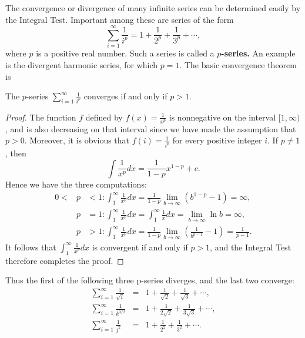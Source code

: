 The convergence or divergence of many infinite series can be determined easily by the Integral Test. Important among these are series of the form
$$
\sum_{i=1}^\infty \frac{1}{i^p} = 1 + \frac{1}{2^p} + \frac{1}{3^p} + \cdots ,
$$
where $p$ is a positive real number. Such a series is called a \textbf{$p$-series.}  An example is the divergent harmonic series, for which $p = 1$. The basic convergence theorem is

\begin{theorem} %
The $p$-series $\sum_{i=1}^\infty \frac{1}{i^p}$ converges if and only if $p > 1$.
\end{theorem}

\begin{proof}
The function $f$ defined by $f(x) = \frac{1}{x^p}$ is nonnegative on the interval $[1, \infty)$, and is also decreasing on that interval since we have made the assumption that $p > 0$. Moreover, it is obvious that $f(i) = \frac{1}{i^p}$ for every positive integer $i$. If $p \neq 1$, then 
$$
\int \frac{1}{x^p} dx = \frac{1}{1-p}x^{1-p} + c.
$$
Hence we have the three computations:
\begin{eqnarray*}
0 < &p& < 1: \int_1^\infty \frac{1}{x^p} dx = \frac{1}{1 - p} \lim_{b \rightarrow \infty}  (b^{1-p} - 1) = \infty, \\
&p& = 1: \int_1^\infty \frac{1}{x^p} dx = \int_1^\infty \frac{1}{x} dx = \lim_{b \rightarrow \infty} \ln b = \infty, \\
&p& > 1: \int_1^\infty \frac{1}{x^p} dx = \frac{1}{1-p} \lim_{b \rightarrow \infty} (\frac{1}{b^{p-1}} - 1) = \frac{1}{p-1}.
\end{eqnarray*}
It follows that $\int_1^\infty \frac{1}{x^p}dx$ is convergent if and only if $p > 1$, and the Integral Test therefore completes the proof.
\end{proof}

Thus the first of the following three p-series diverges, and the last two converge:
\begin{eqnarray*}
\sum_{i=1}^\infty \frac{1}{\sqrt i} &=& 1+ \frac{1}{\sqrt 2} + \frac{1}{\sqrt 3} + \cdots , \\
\sum_{i=1}^\infty \frac{1}{k ^{3/2}} &=& 1 + \frac{1}{2 \sqrt 2} + \frac{1}{3 \sqrt 3} + \cdots ,\\
\sum_{i=1}^\infty \frac{1}{j^2}  &=& 1 +  \frac{1}{2^2} + \frac{1}{3^2} + \cdots .
\end{eqnarray*}

